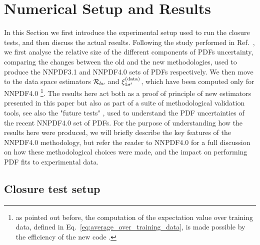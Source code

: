 \section{Numerical Setup and Results}

In this Section we first introduce the experimental setup used to run the
closure tests, and then discuss the actual results. Following the study performed in 
Ref.~\cite{nnpdf30}, we first analyse the relative 
size of the different components of PDFs uncertainty, comparing the changes between the old
and the new methodologies, used to produce the NNPDF3.1 \cite{Ball_2017} and NNPDF4.0 \cite{NNPDF40} 
sets of PDFs respectively. We then move to the data space estimators $\mathcal{R}_{bv}$ and $\xi^{(\rm data)}_{1 {{\sigma}^{\prime}}}$,
which have been computed only for NNPDF4.0
\footnote{as pointed out before, the computation of the expectation value over training data,
defined in Eq.~\ref{eq:average_over_training_data}, is made possible by the efficiency of the new code \cite{nnpdf40code}.}.
The results here act both as a proof of principle of new estimators presented in this paper but also
as part of a suite of methodological validation tools, see also the "future
tests" \cite{Cruz_Martinez_2021}, used to understand the PDF uncertainties of
the recent NNPDF4.0 set of PDFs. For the purpose of understanding how the
results here were produced, we will briefly describe the key features of the
NNPDF4.0 methodology, but refer the reader to NNPDF4.0 for a full discussion on
how these methodological choices were made, and the impact on performing PDF
fits to experimental data.

\subsection{Closure test setup}

